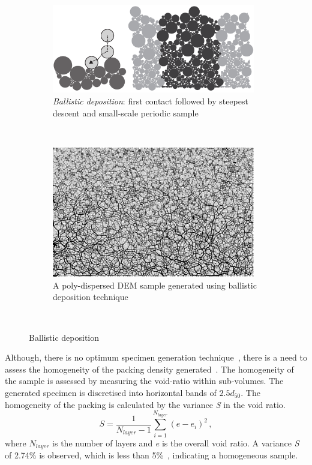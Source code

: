 \begin{figure}[htbp]
\centering
	\begin{subfigure}[b]{0.95\textwidth}
	\centering
	\includegraphics[width=0.975\textwidth]{ballistic}
	\caption{\textit{Ballistic deposition}: first contact followed by 
	steepest descent and small-scale periodic sample~\citep{Radjai2011}}
	\label{fig:ballistic}
	\end{subfigure} \\
	\begin{subfigure}[b]{0.95\textwidth}
	\centering
	\includegraphics[width=0.975\textwidth]{DEM_Sample_r6}
	\caption{A poly-dispersed DEM sample generated using ballistic deposition 
	technique}
	\label{fig:DEM_Sample_r6}
	\end{subfigure} \\
\caption{Ballistic deposition}
\label{fig:ballistic_sample}
\end{figure}

Although, there is no optimum specimen generation 
technique~\citep{OSullivan2011}, there is a need to assess the homogeneity of 
the packing density generated~\citep{Jiang2003}. The homogeneity of the sample 
is assessed by measuring the void-ratio within sub-volumes. The generated 
specimen is discretised into horizontal bands of $2.5d_{50}$. The homogeneity 
of the packing is calculated by the variance \textit{S} in the void ratio.
%
\begin{equation}
S=\frac{1}{N_{layer}-1}\sum\limits_{i=1}^{N_{layer}}(e - e_i)^2 \,,
\end{equation}
%
where $N_{layer}$ is the number of layers and \textit{e} is the overall void 
ratio. A variance \textit{S} of 2.74\% is observed, which is less than 
5\%~\citet{Jiang2003}, indicating a homogeneous sample.


